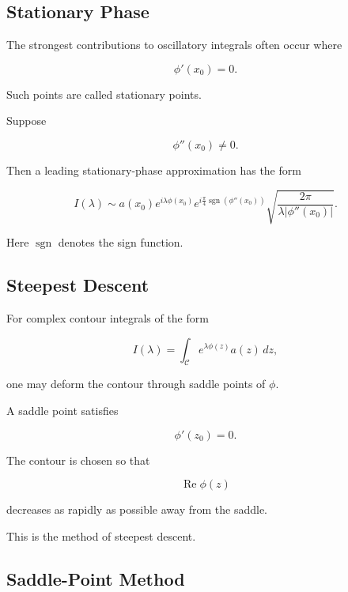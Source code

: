 \subsection{Stationary Phase}
\label{subsec:stationary-phase}

The strongest contributions to oscillatory integrals often occur where

\[
\boxed{
\phi'(x_0)=0.
}
\]

Such points are called stationary points.

Suppose

\[
\phi''(x_0)\neq0.
\]

Then a leading stationary-phase approximation has the form

\[
\boxed{
I(\lambda)
\sim
a(x_0)
e^{i\lambda\phi(x_0)}
e^{i\frac{\pi}{4}\operatorname{sgn}(\phi''(x_0))}
\sqrt{
\frac{2\pi}
{\lambda|\phi''(x_0)|}
}.
}
\]

Here \(\operatorname{sgn}\) denotes the sign function.

\subsection{Steepest Descent}
\label{subsec:steepest-descent}

For complex contour integrals of the form

\[
\boxed{
I(\lambda)
=
\int_{\mathcal C}
e^{\lambda\phi(z)}
a(z)\,dz,
}
\]

one may deform the contour through saddle points of \(\phi\).

A saddle point satisfies

\[
\boxed{
\phi'(z_0)=0.
}
\]

The contour is chosen so that

\[
\operatorname{Re}\phi(z)
\]

decreases as rapidly as possible away from the saddle.

This is the method of steepest descent.

\subsection{Saddle-Point Method}
\label{subsec:saddle-point-method}

